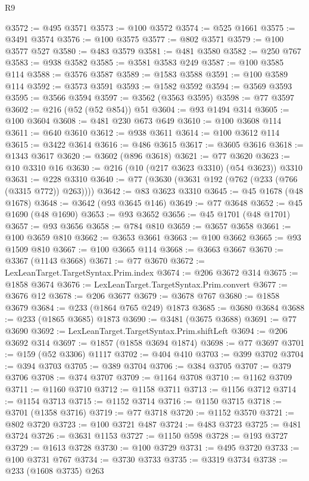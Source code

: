 \begin{lexlean}{R9}
\begin{coremodule}
{{{{{{{{{{{{{{{{{{{{{{{{{{{{{{{{{{{{{{{{{{{{{{{{{{{{{{{{{{{{{{{{{{{{{{{{{{{{{{{{{{{{{{{{{{{{{{{{{{{{{{{{{{{{@3572 := @495 @3571
@3573 := @100 @3572
@3574 := @525 @1661
@3575 := @3491 @3574
@3576 := @100 @3575
@3577 := @802 @3571
@3579 := @100 @3577 @527
@3580 := @483 @3579
@3581 := @481 @3580
@3582 := @250 @767
@3583 := @938 @3582
@3585 := @3581 @3583 @249
@3587 := @100 @3585 @114
@3588 := @3576 @3587
@3589 := @1583 @3588
@3591 := @100 @3589 @114
@3592 := @3573 @3591
@3593 := @1582 @3592
@3594 := @3569 @3593
@3595 := @3566 @3594
@3597 := @3562 (@3563 @3595)
@3598 := @77 @3597
@3602 := @216 (@52 (@52 @854)) @51
@3604 := @93 @1494 @314
@3605 := @100 @3604
@3608 := @481 @230 @673 @649
@3610 := @100 @3608 @114
@3611 := @640 @3610
@3612 := @938 @3611
@3614 := @100 @3612 @114
@3615 := @3422 @3614
@3616 := @486 @3615
@3617 := @3605 @3616
@3618 := @1343 @3617
@3620 := @3602 (@896 @3618)
@3621 := @77 @3620
@3623 := @10 @3310 @16
@3630 := @216 (@10 (@217 @3623 @3310) (@54 @3623)) @3310
@3631 := @228 @3310
@3640 := @77 (@3630 (@3631 @192 (@762 (@233 (@766 (@3315 @772)) @263))))
@3642 := @83 @3623 @3310
@3645 := @45 @1678 (@48 @1678)
@3648 := @3642 (@93 @3645 @146)
@3649 := @77 @3648
@3652 := @45 @1690 (@48 @1690)
@3653 := @93 @3652
@3656 := @45 @1701 (@48 @1701)
@3657 := @93 @3656
@3658 := @784 @810
@3659 := @3657 @3658
@3661 := @100 @3659 @810
@3662 := @3653 @3661
@3663 := @100 @3662
@3665 := @93 @1509 @810
@3667 := @100 @3665 @114
@3668 := @3663 @3667
@3670 := @3367 (@1143 @3668)
@3671 := @77 @3670
@3672 := LexLeanTarget.TargetSyntax.Prim.index
@3674 := @206 @3672 @314
@3675 := @1858 @3674
@3676 := LexLeanTarget.TargetSyntax.Prim.convert
@3677 := @3676 @12
@3678 := @206 @3677
@3679 := @3678 @767
@3680 := @1858 @3679
@3684 := @233 (@1864 @765 @249) @1873
@3685 := @3680 @3684
@3688 := @233 (@1865 @3685) @1873
@3690 := @3481 (@3675 @3688)
@3691 := @77 @3690
@3692 := LexLeanTarget.TargetSyntax.Prim.shiftLeft
@3694 := @206 @3692 @314
@3697 := @1857 (@1858 @3694 @1874)
@3698 := @77 @3697
@3701 := @159 (@52 @3306) @1117
@3702 := @404 @410
@3703 := @399 @3702
@3704 := @394 @3703
@3705 := @389 @3704
@3706 := @384 @3705
@3707 := @379 @3706
@3708 := @374 @3707
@3709 := @1164 @3708
@3710 := @1162 @3709
@3711 := @1160 @3710
@3712 := @1158 @3711
@3713 := @1156 @3712
@3714 := @1154 @3713
@3715 := @1152 @3714
@3716 := @1150 @3715
@3718 := @3701 (@1358 @3716)
@3719 := @77 @3718
@3720 := @1152 @3570
@3721 := @802 @3720
@3723 := @100 @3721 @487
@3724 := @483 @3723
@3725 := @481 @3724
@3726 := @3631 @1153
@3727 := @1150 @598
@3728 := @193 @3727
@3729 := @1613 @3728
@3730 := @100 @3729
@3731 := @495 @3720
@3733 := @100 @3731 @767
@3734 := @3730 @3733
@3735 := @3319 @3734
@3738 := @233 (@1608 @3735) @263
}}}}}}}}}}}}}}}}}}}}}}}}}}}}}}}}}}}}}}}}}}}}}}}}}}}}}}}}}}}}}}}}}}}}}}}}}}}}}}}}}}}}}}}}}}}}}}}}}}}}}}}}}}}}
\end{coremodule}
\end{lexlean}
